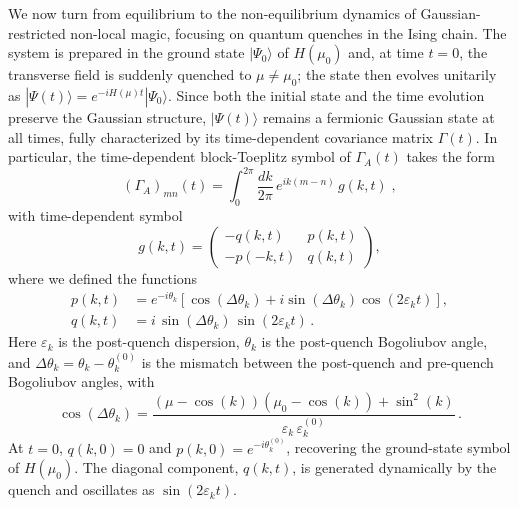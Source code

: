 \documentclass[prx,twocolumn,superscriptaddress,aps,10pt, frontmatterverbose, reprint,footinbib,longbibliography=true]{revtex4-2}
\begin{document}
We now turn from equilibrium to the non-equilibrium dynamics of Gaussian-restricted non-local magic, focusing on quantum quenches in the Ising chain.
The system is prepared in the ground state $|\Psi_0\rangle$ of $H(\mu_0)$ and, at time $t=0$, the transverse field is suddenly quenched to $\mu \neq \mu_0$; the state then evolves unitarily as $|\Psi(t)\rangle = e^{-iH(\mu)t}|\Psi_0\rangle$.
Since both the initial state and the time evolution preserve the Gaussian structure, $|\Psi(t)\rangle$ remains a fermionic Gaussian state at all times, fully characterized by its time-dependent covariance matrix $\Gamma(t)$.
In particular, the time-dependent block-Toeplitz symbol of $\Gamma_A(t)$ takes the form~\cite{Calabrese2005evolution}
\begin{equation}
    (\Gamma_A)_{mn}(t) = \int_0^{2\pi}\!\frac{dk}{2\pi}\,e^{ik(m-n)}\,g(k,t)\;,\label{eq:mustang}
\end{equation}
with time-dependent symbol
\begin{equation}
    g(k,t) = \begin{pmatrix} -q(k,t) & p(k,t) \\ -p(-k,t) & q(k,t) \end{pmatrix},
    \label{eq:symbol_t}
\end{equation}
where we defined the functions
\begin{equation}
\begin{split}
    p(k,t) &= e^{-i\theta_k}\left[\cos(\Delta\theta_k) + i\sin(\Delta\theta_k)\cos (2\varepsilon_k t) \right], \\
    q(k,t) &= i\,\sin(\Delta\theta_k)\,\sin (2\varepsilon_k t)\,.
    \label{eq:pq_symbol}
\end{split}
\end{equation}
Here $\varepsilon_k $ is the post-quench dispersion, $\theta_k$ is the post-quench Bogoliubov angle, and $\Delta\theta_k = \theta_k - \theta_k^{(0)}$ is the mismatch between the post-quench and pre-quench Bogoliubov angles, with
\begin{equation}
    \cos(\Delta\theta_k) = \frac{(\mu-\cos(k))(\mu_0-\cos (k))+\sin^2 (k)}{\varepsilon_k\,\varepsilon_k^{(0)}}\,.
    \label{eq:cos_delta_theta}
\end{equation}
At $t=0$, $q(k,0) = 0$ and $p(k,0) = e^{-i\theta_k^{(0)}}$, recovering the ground-state symbol of $H(\mu_0)$.
The diagonal component, $q(k,t)$, is generated dynamically by the quench and oscillates as $\sin(2\varepsilon_k t)$.
\end{document}
